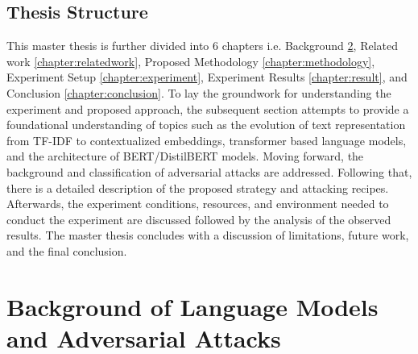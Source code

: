 \documentclass[%
	BCOR=8mm, %
	DIV=12,
	toc=bibliography, %
	toc=listof, %
	oneside, %
	egregdoesnotlikesansseriftitles, %
	]{scrbook}
\begin{document}
\section{Thesis Structure}
This master thesis is further divided into 6 chapters i.e. Background \ref{chapter:background}, Related work \ref{chapter:relatedwork}, Proposed Methodology \ref{chapter:methodology}, Experiment Setup \ref{chapter:experiment}, Experiment Results \ref{chapter:result}, and Conclusion \ref{chapter:conclusion}. To lay the groundwork for understanding the experiment and proposed approach, the subsequent section attempts to provide a foundational understanding of topics such as the evolution of text representation from TF-IDF to contextualized embeddings, transformer based language models, and the architecture of BERT/DistilBERT models. Moving forward, the background and classification of adversarial attacks are addressed. Following that, there is a detailed description of the proposed strategy and attacking recipes. Afterwards, the experiment conditions, resources, and environment needed to conduct the experiment are discussed followed by the analysis of the observed results. The master thesis concludes with a discussion of limitations, future work, and the final conclusion.
\chapter{Background of Language Models and Adversarial Attacks}
\label{chapter:background}
\end{document}
